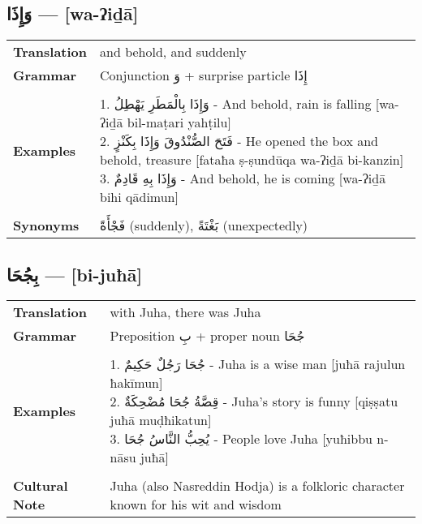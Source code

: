 \documentclass[letter,12pt]{article}
\begin{document}
\subsection{\textarabic{وَإِذَا} — [wa-ʔiḏā]}
\begin{tabular}{p{3cm}p{10cm}}
\toprule
\textbf{Translation} & and behold, and suddenly \\
\textbf{Grammar} & Conjunction \textarabic{وَ} + surprise particle \textarabic{إِذَا} \\
\midrule \\
\textbf{Examples} & \makecell[l]{\parbox{9.5cm}{
1. \textarabic{وَإِذَا بِالْمَطَرِ يَهْطِلُ} - And behold, rain is falling [wa-ʔiḏā bil-maṭari yahṭilu]\\
2. \textarabic{فَتَحَ الصُّنْدُوقَ وَإِذَا بِكَنْزٍ} - He opened the box and behold, treasure [fataħa ṣ-ṣundūqa wa-ʔiḏā bi-kanzin]\\
3. \textarabic{وَإِذَا بِهِ قَادِمٌ} - And behold, he is coming [wa-ʔiḏā bihi qādimun]
}} \\
\midrule \\
\textbf{Synonyms} & \textarabic{فَجْأَةً} (suddenly), \textarabic{بَغْتَةً} (unexpectedly) \\
\bottomrule
\end{tabular}

\subsection{\textarabic{بِجُحَا} — [bi-juħā]}
\begin{tabular}{p{3cm}p{10cm}}
\toprule
\textbf{Translation} & with Juha, there was Juha \\
\textbf{Grammar} & Preposition \textarabic{بِ} + proper noun \textarabic{جُحَا} \\
\midrule \\
\textbf{Examples} & \makecell[l]{\parbox{9.5cm}{
1. \textarabic{جُحَا رَجُلٌ حَكِيمٌ} - Juha is a wise man [juħā rajulun ħakīmun]\\
2. \textarabic{قِصَّةُ جُحَا مُضْحِكَةٌ} - Juha's story is funny [qiṣṣatu juħā muḍħikatun]\\
3. \textarabic{يُحِبُّ النَّاسُ جُحَا} - People love Juha [yuħibbu n-nāsu juħā]
}} \\
\midrule \\
\textbf{Cultural Note} & Juha (also Nasreddin Hodja) is a folkloric character known for his wit and wisdom \\
\bottomrule
\end{tabular}
\end{document}
